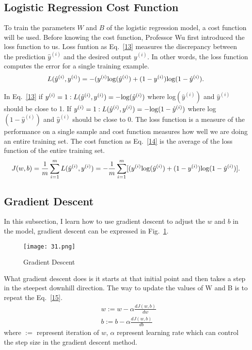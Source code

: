 \documentclass[a4paper]{article}
\begin{document}
\subsection{Logistic Regression Cost Function}
To train the parameters $W$ and $B$ of the logistic regression model, a cost function will be used. Before knowing the cost function, Professor Wu first introduced the loss function to us. Loss funtion as Eq.~\ref{13} measures the discrepancy between the prediction $\hat{y}^{(i)}$ and the desired output $y^{(i)}$. In other words, the loss function computes the error for a single training example.
\begin{equation}\label{13}
\begin{split}
L(\hat{y}^{(i)},y^{(i)})=-(y^{(i)}{\rm log}(\hat{y}^{(i)})+(1-y^{(i)}){\rm log}(1-\hat{y}^{(i)}).
\end{split}
\end{equation}
\par 
In Eq.~\ref{13} if $y^{(i)}=1: L(\hat{y}^{(i)},y^{(i)})=-{\rm log}(\hat{y}^{(i)})$ where log$(\hat{y}^{(i)})$ and $\hat{y}^{(i)}$ should be close to 1. If $y^{(i)}=1: L(\hat{y}^{(i)},y^{(i)})=-{\rm log}(1-\hat{y}^{(i)})$ where log$(1-\hat{y}^{(i)})$ and $\hat{y}^{(i)}$ should be close to 0. The loss function is a measure of the performance on a single sample and cost function measures how well we are doing an entire training set.
The cost function as Eq.~\ref{14} is the average of the loss function of the entire training set.
\begin{equation}\label{14}
\begin{split}
J(w,b)=\frac{1}{m}\sum_{i=1}^{m}L(\hat{y}^{(i)},y^{(i)})=-\frac{1}{m}\sum_{i=1}^{m}[(y^{(i)}{\rm log}(\hat{y}^{(i)})+(1-y^{(i)}){\rm log}(1-\hat{y}^{(i)})].
\end{split}
\end{equation}
\subsection{Gradient Descent}
In this subsection, I learn how to use gradient descent to adjust the $w$ and $b$ in the model, gradient descent can be expressed in Fig.~\ref{3}.
\begin{figure}[h]
\begin{center}
  \texttt{[image: 31.png]}\\
  \caption{Gradient Descent}\label{3}
\end{center}
\end{figure}
\par
What gradient descent does is it starts at that initial point and then takes a step in the steepest downhill direction. The way to update the values of W and B is to repeat the Eq.~\ref{15}.
\begin{equation}\label{15}
\begin{split}
&w:=w-\alpha\frac{dJ(w,b)}{dw} \\
&b:=b-\alpha\frac{dJ(w,b)}{db}
\end{split}
\end{equation}
 where $:=$ represent iteration of $w$, $\alpha$ represent learning rate which can control the step size in the gradient descent method. 
\end{document}
